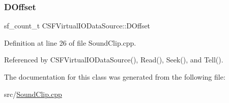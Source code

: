 \hypertarget{classCSFVirtualIODataSource_a29db7bf8a3a7103deacb80bf619919c8}{}\label{classCSFVirtualIODataSource_a29db7bf8a3a7103deacb80bf619919c8} 
\subsubsection{\texorpdfstring{D\+Offset}{DOffset}}
{\footnotesize\ttfamily sf\+\_\+count\+\_\+t C\+S\+F\+Virtual\+I\+O\+Data\+Source\+::\+D\+Offset\hspace{0.3cm}{\ttfamily [protected]}}



Definition at line 26 of file Sound\+Clip.\+cpp.



Referenced by C\+S\+F\+Virtual\+I\+O\+Data\+Source(), Read(), Seek(), and Tell().



The documentation for this class was generated from the following file\+:\begin{DoxyCompactItemize}
\item 
src/\hyperlink{SoundClip_8cpp}{Sound\+Clip.\+cpp}\end{DoxyCompactItemize}
